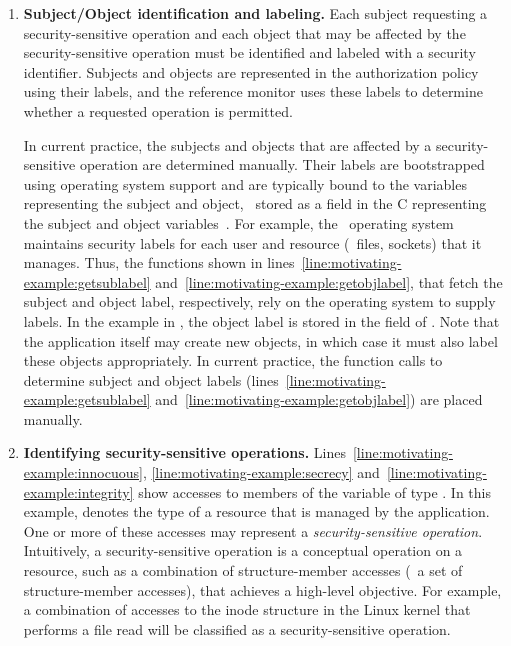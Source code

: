\begin{enumerate}

\item \textbf{Subject/Object identification and labeling.} Each subject
requesting a security-sensitive operation and each object that may be affected
by the security-sensitive operation must be identified and labeled with a
security identifier.  Subjects and objects are represented in the authorization
policy using their labels, and the reference monitor uses these labels to
determine whether a requested operation is permitted. 

In current practice, the subjects and objects that are affected by a
security-sensitive operation are determined manually. Their labels are
bootstrapped using operating system support and are typically bound to the
variables representing the subject and object, \eg~stored as a field in the C
 representing the subject and object
variables~\cite{ksv03,hms06,hrj+07,f06}.  For example, the \selinux\ operating
system~\cite{ls01a,m04} maintains security labels for each user and resource
(\eg~files, sockets) that it manages. Thus, the functions shown in
lines~\ref{line:motivating-example:getsublabel}
and~\ref{line:motivating-example:getobjlabel}, that fetch the subject and
object label, respectively, rely on the operating system to supply labels.  In
the example in , the object
label is stored in the field  of .  Note that
the application itself may create new objects, in which case it must also label
these objects appropriately. In current practice, the function calls to
determine subject and object labels
(lines~\ref{line:motivating-example:getsublabel}
and~\ref{line:motivating-example:getobjlabel}) are placed manually.


\item \textbf{Identifying security-sensitive operations.}
Lines~\ref{line:motivating-example:innocuous},
\ref{line:motivating-example:secrecy}
and~\ref{line:motivating-example:integrity} show accesses to members of the
variable  of type . In this example,  denotes the type of a resource that is managed by the application. One
or more of these accesses may represent a \textit{security-sensitive
operation}. Intuitively, a security-sensitive operation is a conceptual
operation on a resource, such as a combination of structure-member accesses
(\eg~a set of structure-member accesses), that achieves a high-level objective.
For example, a combination of accesses to the inode structure in the Linux
kernel that performs a file read will be classified as a security-sensitive
operation.


\end{enumerate}
